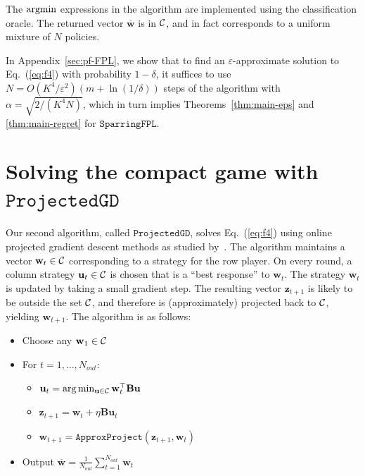The $\operatornamewithlimits{argmin}$ expressions in the algorithm are implemented using the classification oracle. The returned vector ${\overline{\mathbf{w}}}$ is in ${\cal C}$, and in fact corresponds to a uniform mixture of ${N}$ policies.

In Appendix~\ref{sec:pf-FPL}, we show that to find an \ensuremath{\varepsilon}-approximate solution to Eq.~(\ref{eq:f4}) with probability $1-\delta$, it suffices to use ${N} = O(K^4/\ensuremath{\varepsilon}^2) (m+\ln (1/\delta))$
steps of the algorithm with
    ${\alpha}=\sqrt{2/(K^4 {N})}$, which in turn implies Theorems~\ref{thm:main-eps} and \ref{thm:main-regret} for \ensuremath{\mathtt{SparringFPL}}.

\section{Solving the compact game with \ensuremath{\mathtt{ProjectedGD}}}
\label{sec:PGD}

Our second algorithm, called \ensuremath{\mathtt{ProjectedGD}}, solves Eq.~(\ref{eq:f4}) using online projected gradient descent methods as studied by~\cite{Zinkevich03:online}. The algorithm maintains a vector $\mathbf{w}_t\in{\cal C}$ corresponding to a strategy for the row player. On every round, a column strategy $\mathbf{u}_t\in{\cal C}$ is chosen that is a ``best response'' to $\mathbf{w}_t$.
The strategy $\mathbf{w}_t$ is updated by taking a small gradient step. The resulting vector $\mathbf{z}_{t+1}$ is likely to be outside the set
${\cal C}$, and therefore is (approximately) projected back to ${\cal C}$, yielding $\mathbf{w}_{t+1}$.
The algorithm is as follows:

\begin{itemize}   \itemsep0pt \parskip0pt  \item Choose any $\mathbf{w}_1\in{\cal C}$
\item
For $t=1,\ldots,{N_{out}}$:

\begin{itemize}   \itemsep0pt \parskip0pt  \item
$\mathbf{u}_t = \arg\min_{\mathbf{u}\in{\cal C}} {\mathbf{w}_t^{\top}} \mathbf{B} \mathbf{u}$
\item
$\mathbf{z}_{t+1} = \mathbf{w}_t + \eta \mathbf{B} \mathbf{u}_t$
\item
$\mathbf{w}_{t+1} = {\ensuremath{\mathtt{ApproxProject}}}(\mathbf{z}_{t+1}, \mathbf{w}_t)$
\end{itemize}

\item Output ${\overline{\mathbf{w}}}=\frac{1}{{N_{out}}} \sum_{t=1}^{{N_{out}}} \mathbf{w}_t$
\end{itemize}

